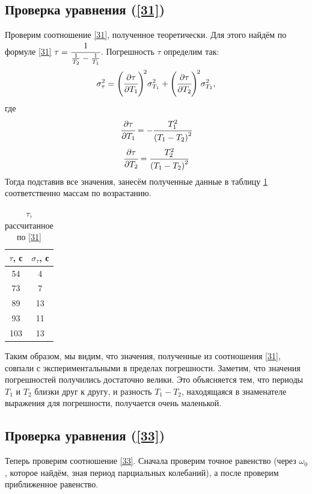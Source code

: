 \documentclass[a4paper,12pt]{article}
\theoremstyle{plain} %
\theoremstyle{definition} %
\theoremstyle{remark} %
\begin{document}
\subsection{Проверка уравнения (\ref{31})}
Проверим соотношение \eqref{31}, полученное теоретически. Для этого найдём по формуле \eqref{31} $\tau=\cfrac{1}{\frac{1}{T_2}-\frac{1}{T_1}}$. Погрешность $\tau$ определим так:
\begin{equation}
\sigma^2_{\tau}=\left(\cfrac{\partial\tau}{\partial T_1}\right)^{\!2}\!\sigma^2_{T_1}+\left(\cfrac{\partial\tau}{\partial T_2}\right)^{\!2}\!\sigma^2_{T_2},
\label{35}
\end{equation}
где
$$\cfrac{\partial\tau}{\partial T_1} = -\cfrac{T^2_1}{\left(T_1-T_2\right)^2}$$
$$\cfrac{\partial\tau}{\partial T_2} = \cfrac{T^2_2}{\left(T_1-T_2\right)^2}$$
Тогда подставив все значения, занесём полученные данные в таблицу \ref{my-label_31} соответственно массам по возрастанию.
\begin{table}[h!]
	\centering
	\caption{$\tau$, рассчитанное по \eqref{31}}
	\label{my-label_31}
	\begin{tabular}{|c|c|}
		\hline
		$\tau$, с & $\sigma_{\tau}$, с \\ \hline
		54        & 4                  \\ \hline
		73        & 7                  \\ \hline
		89        & 13                 \\ \hline
		93        & 11                 \\ \hline
		103       & 13                 \\ \hline
	\end{tabular}
\end{table}

Таким образом, мы видим, что значения, полученные из соотношения \eqref{31}, совпали с экспериментальными в пределах погрешности. Заметим, что значения погрешностей получились достаточно велики. Это объясняется тем, что периоды $T_1$ и $T_2$ близки друг к другу, и разность $T_1-T_2$, находящаяся в знаменателе выражения для погрешности, получается очень маленькой.

\subsection{Проверка уравнения (\ref{33})}
Теперь проверим соотношение \eqref{33}. Сначала проверим точное равенство (через $\omega_0$, которое найдём, зная период парциальных колебаний), а после проверим приближенное равенство.
\end{document}

